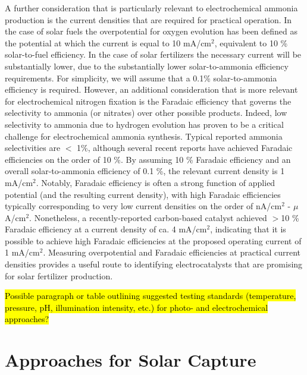 A further consideration that is particularly relevant to electrochemical ammonia production is the current densities that are required for practical operation. In the case of solar fuels the overpotential for oxygen evolution has been defined as the potential at which the current is equal to 10 mA/cm$^2$, equivalent to 10 \% solar-to-fuel efficiency. In the case of solar fertilizers the necessary current will be substantially lower, due to the substantially lower solar-to-ammonia efficiency requirements. For simplicity, we will assume that a 0.1\% solar-to-ammonia efficiency is required. However, an additional consideration that is more relevant for electrochemical nitrogen fixation is the Faradaic efficiency that governs the selectivity to ammonia (or nitrates) over other possible products. Indeed, low selectivity to ammonia due to hydrogen evolution has proven to be a critical challenge for electrochemical ammonia synthesis. Typical reported ammonia selectivities are $<$ 1\%, although several recent reports have achieved Faradaic efficiencies on the order of 10 \%. By assuming 10 \% Faradaic efficiency and an overall solar-to-ammonia efficiency of 0.1 \%, the relevant current density is 1 mA/cm$^2$. Notably, Faradaic efficiency is often a strong function of applied potential (and the resulting current density), with high Faradaic efficiencies typically corresponding to very low current densities on the order of nA/cm$^2$ - $\mu$A/cm$^2$. Nonetheless, a recently-reported carbon-based catalyst achieved $>$10 \% Faradaic efficiency at a current density of ca. 4 mA/cm$^2$, indicating that it is possible to achieve high Faradaic efficiencies at the proposed operating current of 1 mA/cm$^2$. Measuring overpotential and Faradaic efficiencies at practical current densities provides a useful route to identifying electrocatalysts that are promising for solar fertilizer production.

\hl{Possible paragraph or table outlining suggested testing standards (temperature, pressure, pH, illumination intensity, etc.) for photo- and electrochemical approaches?}

\section{Approaches for Solar Capture}
\label{sec:approaches}

